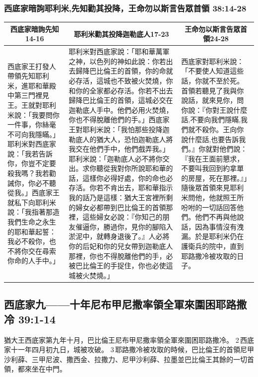 \subsubsection{西底家暗詢耶利米,先知勸其投降，王命勿以斯言告眾首領 38:14-28}
\begin{table}[H]
\centering
\begin{tabular}{p{3.75cm}|p{8.250cm}|p{4.750cm}}\hline\hline
\multicolumn{1}{c|}{西底家暗詢先知14-16}&\multicolumn{1}{c|}{耶利米勸其投降迦勒底人17-23}&\multicolumn{1}{c}{王命勿以斯言告眾首領24-28}\\\hline
西底家王打發人帶領先知耶利米，進耶和華殿中第三門裡見王。王就對耶利米說：「我要問你一件事，你絲毫不可向我隱瞞。」耶利米對西底家說：「我若告訴你，你豈不定要殺我嗎？我若勸誡你，你必不聽從我。」西底家王就私下向耶利米說：「我指著那造我們生命之永生的耶和華起誓：我必不殺你，也不將你交在尋索你命的人手中。」
&耶利米對西底家說：「耶和華萬軍之神，以色列的神如此說：你若出去歸降巴比倫王的首領，你的命就必存活，這城也不致被火焚燒，你和你的全家都必存活。你若不出去歸降巴比倫王的首領，這城必交在迦勒底人手中。他們必用火焚燒，你也不得脫離他們的手。」西底家王對耶利米說：「我怕那些投降迦勒底人的猶大人，恐怕迦勒底人將我交在他們手中，他們戲弄我。」耶利米說：「迦勒底人必不將你交出。求你聽從我對你所說耶和華的話，這樣你必得好處，你的命也必存活。你若不肯出去，耶和華指示我的話乃是這樣：猶大王宮裡所剩的婦女必都帶到巴比倫王的首領那裡，這些婦女必說：『你知己的朋友催逼你，勝過你，見你的腳陷入淤泥中，就轉身退後了。』人必將你的后妃和你的兒女帶到迦勒底人那裡，你也不得脫離他們的手，必被巴比倫王的手捉住，你也必使這城被火焚燒。」
&西底家對耶利米說：「不要使人知道這些話，你就不至於死。首領若聽見了我與你說話，就來見你，問你說：『你對王說什麼話,不要向我們隱瞞,我們就不殺你。王向你說什麼話,也要告訴我們。』你就對他們說：『我在王面前懇求，不要叫我回到約拿單的房屋，死在那裡。』」隨後眾首領來見耶利米問他，他就照王所吩咐的一切話回答他們。他們不再與他說話，因為事情沒有洩漏。於是耶利米仍在護衛兵的院中，直到耶路撒冷被攻取的日子。\\\hline
\end{tabular}
\end{table}




\subsection{西底家九——十年尼布甲尼撒率領全軍來圍困耶路撒冷 39:1-14}
猶大王西底家第九年十月，巴比倫王尼布甲尼撒率領全軍來圍困耶路撒冷。 2 西底家十一年四月初九日，城被攻破。 3 耶路撒冷被攻取的時候，巴比倫王的首領尼甲沙利薛、三甲尼波、撒西金、拉撒力、尼甲沙利薛、拉墨並巴比倫王其餘的一切首領，都來坐在中門。


